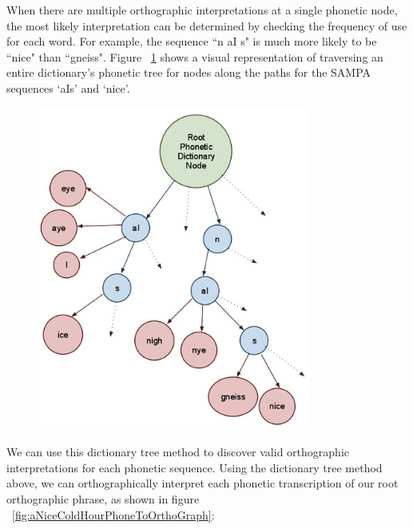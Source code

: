 When there are multiple orthographic interpretations at a single phonetic node, the most likely interpretation can be determined by checking the frequency of use for each word.  For example, the sequence ``n aI s" is much more likely to be ``nice" than ``gneiss".  Figure ~\ref{fig:wordTree} shows a visual representation of traversing an entire dictionary's phonetic tree for nodes along the paths for the SAMPA sequences `aIs' and `nice'.

\begin{figure}[h]
\includegraphics[width=90mm]{wordTree.jpg}
\captionfonts
\caption{}
\label{fig:wordTree}
\end{figure}

We can use this dictionary tree method to discover valid orthographic interpretations for each phonetic sequence.  Using the dictionary tree method above, we can orthographically interpret each phonetic transcription of our root orthographic phrase, as shown in figure ~\ref{fig:aNiceColdHourPhoneToOrthoGraph}:



